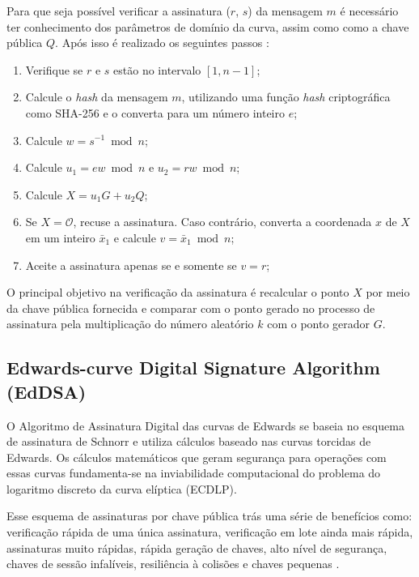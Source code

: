 Para que seja possível verificar a assinatura ($r$, $s$) da mensagem $m$ é necessário ter conhecimento dos parâmetros de domínio da curva, assim como como a chave pública $Q$. Após isso é realizado os seguintes passos \cite{johnson2001elliptic}:
\begin{enumerate}
    \item Verifique se $r$ e $s$ estão no intervalo $[1, n - 1]$;
    \item Calcule o \textit{hash} da mensagem $m$, utilizando uma função \textit{hash} criptográfica como SHA-256 e o converta para um número inteiro $e$;
    \item Calcule $w = s^{-1} \bmod{n}$;
    \item Calcule $u_1 = ew \bmod{n}$ e $u_2 = rw \bmod{n}$;
    \item Calcule $X = u_1 G + u_2 Q$;
    \item Se $X = \mathcal{O}$, recuse a assinatura. Caso contrário, converta a coordenada $x$ de $X$ em um inteiro $\bar x_1$ e calcule $v = \bar x_1 \bmod{n}$;
    \item Aceite a assinatura apenas se e somente se $v = r$;
\end{enumerate}

O principal objetivo na verificação da assinatura é recalcular o ponto $X$ por meio da chave pública fornecida e comparar com o ponto gerado no processo de assinatura pela multiplicação do número aleatório $k$ com o ponto gerador $G$.  

\subsection{Edwards-curve Digital Signature Algorithm (EdDSA)}

O Algoritmo de Assinatura Digital das curvas de Edwards se baseia no esquema de assinatura de Schnorr e utiliza cálculos baseado nas curvas torcidas de Edwards. Os cálculos matemáticos que geram segurança para operações com essas curvas fundamenta-se na inviabilidade computacional do problema do logaritmo discreto da curva elíptica (ECDLP).

Esse esquema de assinaturas por chave pública trás uma série de benefícios como: verificação rápida de uma única assinatura, verificação em lote ainda mais rápida, assinaturas muito rápidas, rápida geração de chaves, alto nível de segurança, chaves de sessão infalíveis, resiliência à colisões e chaves pequenas \cite{bernstein2012high}.

